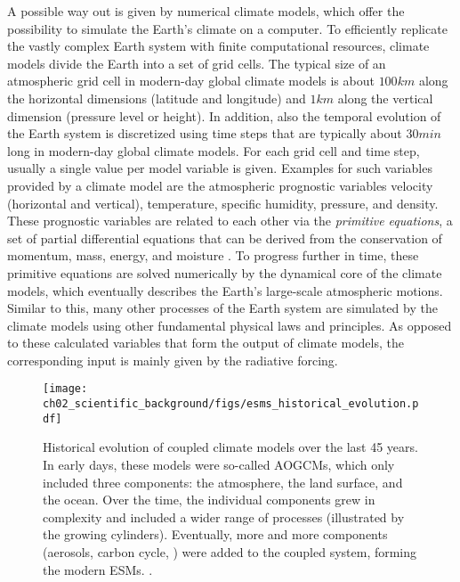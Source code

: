 A possible way out is given by numerical climate models, which offer the
possibility to simulate the Earth's climate on a computer. To efficiently
replicate the vastly complex Earth system with finite computational resources,
climate models divide the Earth into a set of grid cells. The typical size of
an atmospheric grid cell in modern-day global climate models is about $100
\unit{km}$ along the horizontal dimensions (latitude and longitude) and $1
\unit{km}$ along the vertical dimension (pressure level or height). In
addition, also the temporal evolution of the Earth system is discretized using
time steps that are typically about $30 \unit{min}$ long in modern-day global
climate models. For each grid cell and time step, usually a single value per
model variable is given. Examples for such variables provided by a climate
model are the atmospheric prognostic variables velocity (horizontal and
vertical), temperature, specific humidity, pressure, and density. These
prognostic variables are related to each other via the \emph{primitive
  equations}, a set of partial differential equations that can be derived from
the conservation of momentum, mass, energy, and moisture \autocite{Holton2004}.
To progress further in time, these primitive equations are solved numerically
by the dynamical core of the climate models, which eventually describes the
Earth's large-scale atmospheric motions. Similar to this, many other processes
of the Earth system are simulated by the climate models using other fundamental
physical laws and principles. As opposed to these calculated variables that
form the output of climate models, the corresponding input is mainly given by
the radiative forcing.

\begin{figure}[t]
  \centering
  \texttt{[image: 
    ch02\_scientific\_background/figs/esms\_historical\_evolution.pdf]}
  \caption[
    Historical evolution of coupled climate models over the last 45 years.
  ]{
    Historical evolution of coupled climate models over the last 45 years. In
    early days, these models were so-called \acfp{AOGCM}, which only included
    three components: the atmosphere, the land surface, and the ocean. Over the
    time, the individual components grew in complexity and included a wider
    range of processes (illustrated by the growing cylinders). Eventually, more
    and more components (aerosols, carbon cycle, \etc{}) were added to the
    coupled system, forming the modern \acfp{ESM}.
    .
  }
  \label{fig:02:esms_historical_evolution}
\end{figure}

